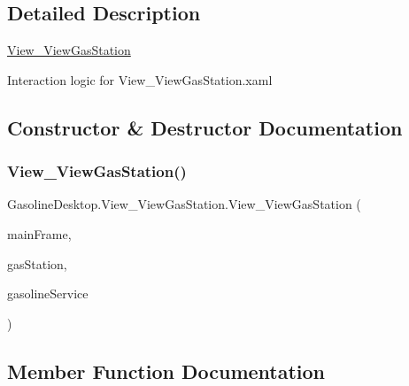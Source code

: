 \subsection{Detailed Description}
\mbox{\hyperlink{class_gasoline_desktop_1_1_view___view_gas_station}{View\+\_\+\+View\+Gas\+Station}} 

Interaction logic for View\+\_\+\+View\+Gas\+Station.\+xaml

\subsection{Constructor \& Destructor Documentation}
\mbox{\label{class_gasoline_desktop_1_1_view___view_gas_station_a3755a37ebae09d9e56d9f005176e6c3e}} 
\subsubsection{\texorpdfstring{View\_ViewGasStation()}{View\_ViewGasStation()}}
{\footnotesize\ttfamily Gasoline\+Desktop.\+View\+\_\+\+View\+Gas\+Station.\+View\+\_\+\+View\+Gas\+Station (\begin{DoxyParamCaption}\item[{Frame}]{main\+Frame,  }\item[{\mbox{\hyperlink{class_gasoline_desktop_1_1_gas_station}{Gas\+Station}}}]{gas\+Station,  }\item[{\mbox{\hyperlink{class_gasoline_desktop_1_1_gasoline_service}{Gasoline\+Service}}}]{gasoline\+Service }\end{DoxyParamCaption})}



\subsection{Member Function Documentation}
\mbox{\label{class_gasoline_desktop_1_1_view___view_gas_station_ad96db5524ba844cefe83a317117ad1bd}} 
